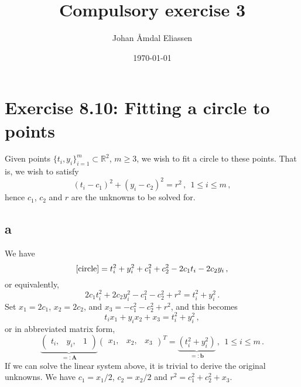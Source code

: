 \documentclass[11pt]{amsart}
\theoremstyle{definition}
\newcommand{\R}{\mathbb{R}}
\numberwithin{equation}{section}
\begin{document}
\title{Compulsory exercise 3}
\author{Johan Åmdal Eliassen}

\maketitle

\date{\today}

\section{Exercise 8.10: Fitting a circle to points}
Given points $\{t_i, y_i\}_{i=1}^m \subset \R^2$, $m \geq 3$, we wish to fit a circle to these points. That is, we wish to satisfy
\begin{equation}\tag{*}\label{circle}
(t_i - c_1)^2 + (y_i - c_2)^2 = r^2\,,\:\:1 \leq i \leq m\,,
\end{equation}
hence $c_1$, $c_2$ and $r$ are the unknowns to be solved for.
\subsection*{a}
We have \begin{equation}
\eqref{circle} = t_i^2 + y_i^2 + c_1^2 + c_2^2 - 2c_1t_i - 2c_2 y_i\,,
\end{equation}
or equivalently,
\begin{equation}
2c_1 t_i^2 + 2c_2 y_i^2 - c_1^2 - c_2^2 + r^2
= t_i^2 + y_i^2\,.
\end{equation}
Set $x_1 = 2c_1$, $x_2 = 2c_2$, and $x_3 = -c_1^2 - c_2^2 + r^2$, and this becomes
\begin{equation}
t_i x_1 + y_i x_2 + x_3 = t_i^2 + y_i^2\,,
\end{equation}
or in abbreviated matrix form,
\begin{equation}
\underbrace{
\left(
\begin{matrix}
t_i, & y_i, & 1
\end{matrix}
\right)}_{=: \mathbf{A}}
\left(
\begin{matrix}
x_1, & x_2, & x_3
\end{matrix}
\right)^T
=
\underbrace{
(t_i^2 + y_i^2)}_{=: \mathbf{b}}\,,\:\:1\leq i \leq m\,.
\end{equation}
If we can solve the linear system above, it is trivial to derive the original unknowns. We have $c_1 = x_1/2$, $c_2 = x_2/2$ and $r^2 = c_1^2 + c_2^2 + x_3$.
\end{document}
